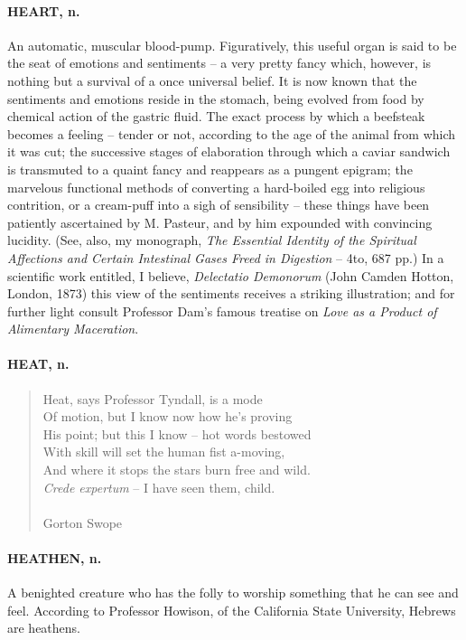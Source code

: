 \documentclass[11pt]{article}
\begin{document}
\paragraph{HEART, n.}  An automatic, muscular blood-pump.  Figuratively, this
useful organ is said to be the seat of emotions and sentiments -- a
very pretty fancy which, however, is nothing but a survival of a once
universal belief.  It is now known that the sentiments and emotions
reside in the stomach, being evolved from food by chemical action of
the gastric fluid.  The exact process by which a beefsteak becomes a
feeling -- tender or not, according to the age of the animal from
which it was cut; the successive stages of elaboration through which a
caviar sandwich is transmuted to a quaint fancy and reappears as a
pungent epigram; the marvelous functional methods of converting a
hard-boiled egg into religious contrition, or a cream-puff into a sigh
of sensibility -- these things have been patiently ascertained by M.
Pasteur, and by him expounded with convincing lucidity.  (See, also,
my monograph, {\em The Essential Identity of the Spiritual Affections and
Certain Intestinal Gases Freed in Digestion} -- 4to, 687 pp.)  In a
scientific work entitled, I believe, {\em Delectatio Demonorum} (John
Camden Hotton, London, 1873) this view of the sentiments receives a
striking illustration; and for further light consult Professor Dam's
famous treatise on {\em Love as a Product of Alimentary Maceration}.

\paragraph{HEAT, n.}

\begin{quote}   Heat, says Professor Tyndall, is a mode \\
      Of motion, but I know now how he's proving \\
  His point; but this I know -- hot words bestowed \\
      With skill will set the human fist a-moving, \\
  And where it stops the stars burn free and wild. \\
  {\em Crede expertum} -- I have seen them, child. \\
 \\
Gorton Swope \end{quote}


\paragraph{HEATHEN, n.}  A benighted creature who has the folly to worship
something that he can see and feel.  According to Professor Howison,
of the California State University, Hebrews are heathens.
\end{document}
